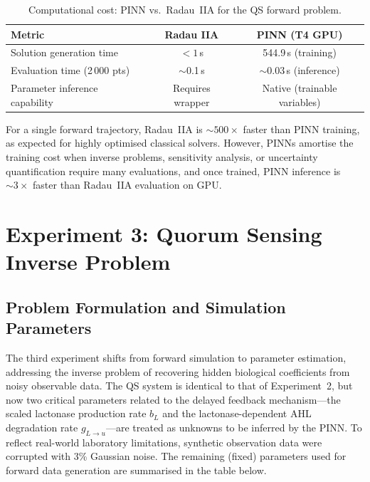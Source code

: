 \documentclass[14pt,a4paper,openany]{extbook}
\begin{document}
\begin{table}[htb]
\centering
\caption{Computational cost: PINN vs.\ Radau~IIA for the QS forward problem.}
\label{tab:qs_efficiency}
\begin{tabular}{lcc}
\hline
\textbf{Metric} & \textbf{Radau IIA} & \textbf{PINN (T4 GPU)} \\ \hline
Solution generation time          & $< 1$\,s        & 544.9\,s (training) \\
Evaluation time (2\,000 pts)      & $\sim$0.1\,s    & $\sim$0.03\,s (inference) \\
Parameter inference capability    & Requires wrapper & Native (trainable variables) \\ \hline
\end{tabular}
\end{table}

For a single forward trajectory, Radau~IIA is $\sim 500\times$ faster
than PINN training, as expected for highly optimised classical solvers.
However, PINNs amortise the training cost when inverse problems,
sensitivity analysis, or uncertainty quantification require many
evaluations, and once trained, PINN inference is $\sim 3\times$ faster
than Radau~IIA evaluation on GPU.

\section{Experiment 3: Quorum Sensing Inverse Problem}
\label{sec:qs_experiment_inverse}

\subsection{Problem Formulation and Simulation Parameters}
\label{subsec:qs_inverse_params}

The third experiment shifts from forward simulation to parameter estimation, addressing the inverse problem of recovering hidden biological coefficients from noisy observable data. The QS system is identical to that of Experiment~2, but now two critical parameters related to the delayed feedback mechanism---the scaled lactonase production rate $b_L$ and the lactonase-dependent AHL degradation rate $g_{L \to u}$---are treated as unknowns to be inferred by the PINN. To reflect real-world laboratory limitations, synthetic observation data were corrupted with 3\% Gaussian noise. The remaining (fixed) parameters used for forward data generation are summarised in the table below.
\end{document}
